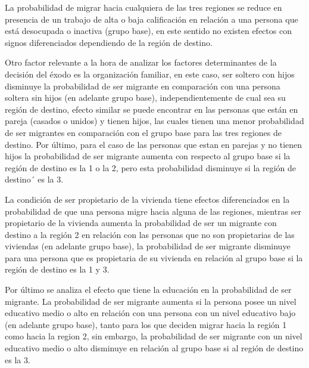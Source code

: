\documentclass[12pt,a4paper]{article}
\begin{document}
La probabilidad de migrar hacia cualquiera de las tres regiones se reduce en presencia de un trabajo de alta o baja calificación en relación a una persona que está desocupada o inactiva (grupo base), en este sentido no existen efectos con signos diferenciados dependiendo de la región de destino.

Otro factor relevante a la hora de analizar los factores determinantes de la decisión del éxodo es la organización familiar, en este caso, ser soltero con hijos disminuye la probabilidad de ser migrante en comparación con una persona soltera sin hijos (en adelante grupo base), independientemente de cual sea su región de destino, efecto similar se puede encontrar en las personas que están en pareja (casados o unidos) y tienen hijos, las cuales tienen una menor probabilidad de ser migrantes en comparación con el grupo base para las tres regiones de destino. Por último, para el caso de las personas que estan en parejas y no tienen hijos la probabilidad de ser migrante aumenta con respecto al grupo base si la región de destino es la 1 o la 2, pero esta  probabilidad  disminuye si la región de destino´ es la 3.

La condición de ser propietario de la vivienda tiene efectos diferenciados en la probabilidad de que una persona migre hacia alguna de las regiones, mientras ser propietario de la vivienda aumenta la probabilidad de ser un migrante con destino a la región 2 en relación con las personas que no son propietarias de las viviendas (en adelante grupo base), la probabilidad de ser migrante disminuye para una persona que es propietaria de su vivienda en relación al grupo base si la región de destino es la 1 y 3.

Por último se analiza el efecto que tiene la educación en la probabilidad de ser migrante. La probabilidad de ser migrante aumenta si la persona posee un nivel educativo medio o alto en relación con una persona con un nivel educativo bajo (en adelante grupo base), tanto para los que deciden migrar hacia la región 1 como hacia la region 2, sin embargo, la probabilidad de ser migrante con un nivel educativo medio o alto disminuye en relación al grupo base si al región de destino es la 3. 
\end{document}
